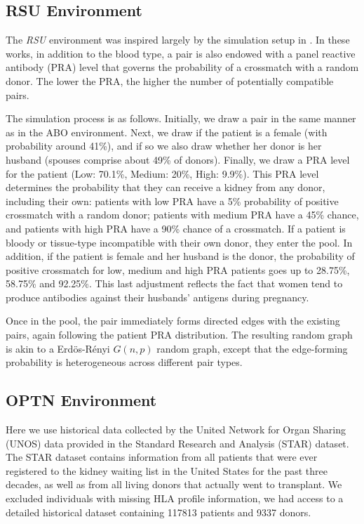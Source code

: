 \documentclass[12pt]{article}
\begin{document}
\subsection{RSU Environment}

The \emph{RSU} environment was inspired largely by the simulation setup in \cite{roth2007efficient}. In these works, in addition to the blood type, a pair is also endowed with a panel reactive antibody (PRA) level that governs the probability of a crossmatch with a random donor. The lower the PRA, the higher the number of potentially compatible pairs.

The simulation process is as follows. Initially, we draw a pair in the same manner as in the ABO environment. Next, we draw if the patient is a female (with probability around 41\%), and if so we also draw whether her donor is her husband (spouses comprise about 49\% of donors). Finally, we draw a PRA level for the patient (Low: 70.1\%, Medium: 20\%, High: 9.9\%). This PRA level determines the probability that they can receive a kidney from any donor, including their own: patients with low PRA have a 5\% probability of positive crossmatch with a random donor; patients with medium PRA have a 45\% chance, and patients with high PRA have a 90\% chance of a crossmatch. If a patient is bloody or tissue-type incompatible with their own donor, they enter the pool. In addition, if the patient is female and her husband is the donor, the probability of positive crossmatch for low, medium and high PRA patients goes up to 28.75\%, 58.75\% and 92.25\%. This last adjustment reflects the fact that women tend to produce antibodies against their husbands' antigens during pregnancy.

Once in the pool, the pair immediately forms directed edges with the existing pairs, again following the patient PRA distribution. The resulting random graph is akin to a Erd\"{o}s-R\'{e}nyi $G(n,p)$ random graph, except that the edge-forming probability is heterogeneous across different pair types.

\subsection{OPTN Environment}

Here we use historical data collected by the United Network for Organ Sharing (UNOS) data provided in the Standard Research and Analysis (STAR) dataset. The STAR dataset contains information from all patients that were ever registered to the kidney waiting list in the United States for the past three decades, as well as from all living donors that actually went to transplant. We excluded individuals with missing HLA profile information, 
we had access to a detailed historical dataset containing 117813 patients and 9337 donors.
\end{document}
